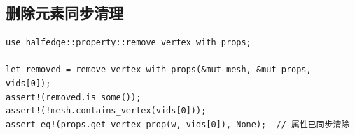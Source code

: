 \documentclass[11pt,a4paper]{article}
\begin{document}
\subsection{删除元素同步清理}

\begin{lstlisting}
use halfedge::property::remove_vertex_with_props;

let removed = remove_vertex_with_props(&mut mesh, &mut props, vids[0]);
assert!(removed.is_some());
assert!(!mesh.contains_vertex(vids[0]));
assert_eq!(props.get_vertex_prop(w, vids[0]), None);  // 属性已同步清除
\end{lstlisting}
\end{document}
